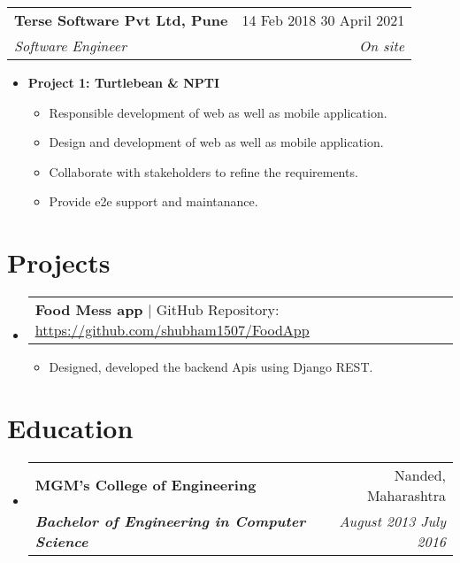 \documentclass[letterpaper, 11pt]{article}
\makeatletter
\newcommand{\resumeItem}[1]{
    \item \small {
        {#1 \vspace{-3pt}}
    }
}
\newcommand{\resumeSubheading}[4]{
  \vspace{-2pt}\item
    \begin{tabular*}{0.99\textwidth}[t]{l@{\extracolsep{\fill}}r}
      \textbf{#1} & #2 \\
      \textit{\small#3} & \textit{\small #4} \\
    \end{tabular*}\vspace{-7pt}
}
\newcommand{\resumeProjectHeading}[2]{
    \item
    \begin{tabular*}{0.99\textwidth}{l@{\extracolsep{\fill}}r}
      \small#1 & \textit{#2}\\
    \end{tabular*}\vspace{-7pt}
}
\newcommand{\resumeItemListStart}{\begin{itemize}[leftmargin=0.25in, label={\textbullet}]}
\newcommand{\resumeItemListEnd}{\end{itemize}\vspace{-10pt}}
\newcommand{\resumeSubHeadingListStart}{\begin{itemize}[leftmargin=0.15in, label={}]}
\newcommand{\resumeSubHeadingListEnd}{\end{itemize}}
\makeatother
\begin{document}
            \vspace{10pt} %

            \resumeSubheading{Terse Software Pvt Ltd, Pune}{14 Feb 2018 \textendash{} 30 April 2021}
                { Software Engineer}{On site}
                \resumeItemListStart{}
                    \item[] \textbf{Project 1: Turtlebean & NPTI}
                    \begin{itemize}[leftmargin=0.5in, label={\textbullet}]
                        \item Responsible development of web as well as mobile application.
                        \item Design and development of web as well as mobile application.
                        \item Collaborate with stakeholders to refine the requirements.
                        \item Provide e2e support and maintanance.
                    \end{itemize}
                \resumeItemListEnd{}
        
   
    
   
\vspace{-17pt}

\section{Projects}
\resumeSubHeadingListStart{}
    \resumeProjectHeading{\textbf{Food Mess app} $|$ GitHub Repository: \underline{\url{https://github.com/shubham1507/FoodApp}}}{}
    \vspace{10pt}
        \resumeItemListStart{}
            \resumeItem{Designed, developed the backend Apis using Django REST.}
        \resumeItemListEnd{}
\resumeSubHeadingListEnd{}

\vspace{-17pt}

\section{Education}
\resumeSubHeadingListStart{}
    \resumeSubheading{MGM's \textendash{} College of Engineering}{Nanded, Maharashtra}
        {\textbf{Bachelor of Engineering in Computer Science}}{August 2013 \textendash{} July 2016}
\resumeSubHeadingListEnd{}

\end{document}
